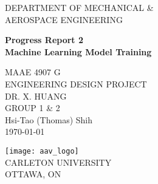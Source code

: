 \begin{titlepage}
    \begin{center}
        \vspace{1cm}
 
        \large
        DEPARTMENT OF MECHANICAL \& \\
        AEROSPACE ENGINEERING
 
        \vspace{6em}

        \huge
        \textbf{Progress Report 2}\\
        \textbf{Machine Learning Model Training}\\

        \vspace{3em}
 
        \large
        MAAE 4907 G\\
        ENGINEERING DESIGN PROJECT\\
        DR. X. HUANG \\

        \vspace{1cm}
        GROUP 1 \& 2\\
        Hsi-Tao (Thomas) Shih\\
        \today
 
        \vfill
             
        \vspace{0.8cm}
      
        \texttt{[image: aav\_logo]}\\
        \footnotesize
        CARLETON UNIVERSITY\\
        OTTAWA, ON
             
    \end{center}
\end{titlepage}